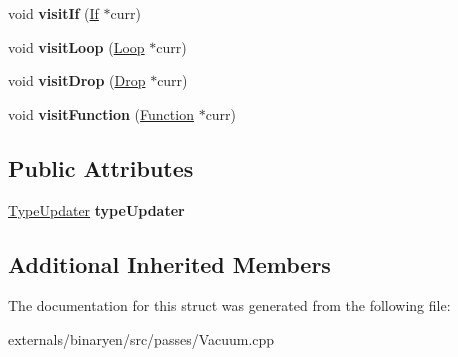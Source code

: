 \begin{DoxyCompactItemize}
\mbox{\label{structwasm_1_1_vacuum_af82539091ed23bb6d59c17b98e98f96b}} 
void {\bfseries visit\+If} (\mbox{\hyperlink{classwasm_1_1_if}{If}} $\ast$curr)
\item 
\mbox{\label{structwasm_1_1_vacuum_a8a44b9e13ad1f8cb30735f04b3ae2e5e}} 
void {\bfseries visit\+Loop} (\mbox{\hyperlink{classwasm_1_1_loop}{Loop}} $\ast$curr)
\item 
\mbox{\label{structwasm_1_1_vacuum_a3096c3d4ebd0df777cab154560f0a114}} 
void {\bfseries visit\+Drop} (\mbox{\hyperlink{classwasm_1_1_drop}{Drop}} $\ast$curr)
\item 
\mbox{\label{structwasm_1_1_vacuum_ab2678f690ec88aba1f2d58404d0d88f0}} 
void {\bfseries visit\+Function} (\mbox{\hyperlink{classwasm_1_1_function}{Function}} $\ast$curr)
\end{DoxyCompactItemize}
\subsection*{Public Attributes}
\begin{DoxyCompactItemize}
\item 
\mbox{\label{structwasm_1_1_vacuum_a18707e9e6716098cb82f47f6c162c0f7}} 
\mbox{\hyperlink{structwasm_1_1_type_updater}{Type\+Updater}} {\bfseries type\+Updater}
\end{DoxyCompactItemize}
\subsection*{Additional Inherited Members}


The documentation for this struct was generated from the following file\+:\begin{DoxyCompactItemize}
\item 
externals/binaryen/src/passes/Vacuum.\+cpp\end{DoxyCompactItemize}
